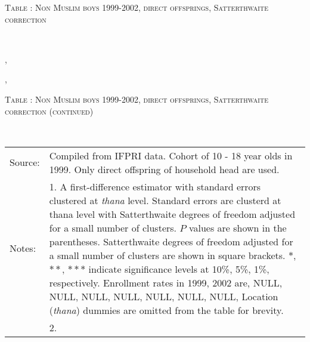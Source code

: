 \begin{table}\hfil\textsc{\footnotesize Table \thetable: Non Muslim boys 1999-2002, direct offsprings, Satterthwaite correction\label{zEm.1999.10.sameN}}\\\setlength{\tabcolsep}{1pt}\renewcommand{\arraystretch}{.675}\hspace{-2em}\hfil{}\\\renewcommand{\arraystretch}{1}\end{table}, \addtocounter{table}{-1}, \begin{table}\hfil\textsc{\footnotesize Table \thetable: Non Muslim boys 1999-2002, direct offsprings, Satterthwaite correction (continued)\label{zEm.1999.10.sameN}}\\\setlength{\tabcolsep}{1pt}\renewcommand{\arraystretch}{.675}\hspace{-2em}\hfil{}\\\renewcommand{\arraystretch}{1}\hfil\begin{tabular}{>{\hfill\scriptsize}p{1cm}<{}>{\scriptsize}p{12cm}<{\hfill}} Source:& Compiled from IFPRI data. Cohort of 10 - 18 year olds in 1999. Only direct offspring of household head are used.\\[-1ex] Notes:& 1. A first-difference estimator with standard errors clustered at \textit{thana} level. Standard errors are clusterd at thana level with Satterthwaite degrees of freedom adjusted for a small number of clusters. $P$ values are shown in the parentheses. Satterthwaite degrees of freedom adjusted for a small number of clusters are shown in square brackets. $*$, $**$, $***$ indicate significance levels at 10\%, 5\%, 1\%, respectively. Enrollment rates in 1999, 2002 are, NULL, NULL, NULL, NULL, NULL, NULL, NULL, Location (\textit{thana}) dummies are omitted from the table for brevity. \\ & 2.   \end{tabular} \end{table}
